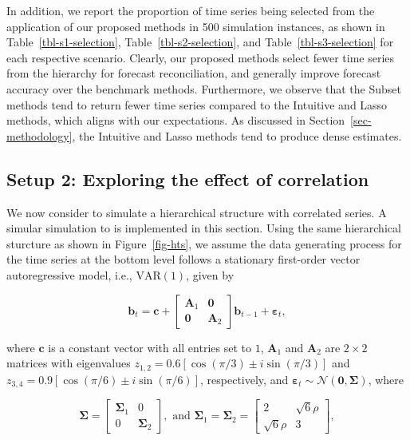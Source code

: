 \documentclass[11pt,a4paper,]{article}
\begin{document}
In addition, we report the proportion of time series being selected from
the application of our proposed methods in 500 simulation instances, as
shown in Table~\ref{tbl-s1-selection}, Table~\ref{tbl-s2-selection}, and
Table~\ref{tbl-s3-selection} for each respective scenario. Clearly, our
proposed methods select fewer time series from the hierarchy for
forecast reconciliation, and generally improve forecast accuracy over
the benchmark methods. Furthermore, we observe that the Subset methods
tend to return fewer time series compared to the Intuitive and Lasso
methods, which aligns with our expectations. As discussed in
Section~\ref{sec-methodology}, the Intuitive and Lasso methods tend to
produce dense estimates.

\hypertarget{sec-sim2}{%
\subsection{Setup 2: Exploring the effect of
correlation}\label{sec-sim2}}

We now consider to simulate a hierarchical structure with correlated
series. A simular simulation to \textcite{Wickramasuriya2021-am} is
implemented in this section. Using the same hierarchical sturcture as
shown in Figure~\ref{fig-hts}, we assume the data generating process for
the time series at the bottom level follows a stationary first-order
vector autoregressive model, i.e., \(\text{VAR}(1)\), given by

\[
\boldsymbol{b}_t= \boldsymbol{c} + \left[\begin{array}{cc}
\boldsymbol{A}_1 & \boldsymbol{0} \\
\boldsymbol{0} & \boldsymbol{A}_2
\end{array}\right] \boldsymbol{b}_{t-1} + \boldsymbol{\varepsilon}_t,
\]

where \(\boldsymbol{c}\) is a constant vector with all entries set to
\(1\), \(\boldsymbol{A}_1\) and \(\boldsymbol{A}_2\) are \(2 \times 2\)
matrices with eigenvalues
\(z_{1,2}=0.6[\cos (\pi / 3) \pm i \sin (\pi / 3)]\) and
\(z_{3,4}=0.9[\cos (\pi / 6) \pm i \sin (\pi / 6)]\), respectively, and
\(\boldsymbol{\varepsilon}_t \sim \mathcal{N}(\boldsymbol{0}, \boldsymbol{\Sigma})\),
where

\[
\boldsymbol{\Sigma}=\left[\begin{array}{cc}
\boldsymbol{\Sigma}_1 & 0 \\0 & \boldsymbol{\Sigma}_2
\end{array}\right], \text { and } \boldsymbol{\Sigma}_1=\boldsymbol{\Sigma}_2=\left[\begin{array}{cc}2 & \sqrt{6} \rho \\\sqrt{6} \rho & 3\end{array}\right],
\]
\end{document}
